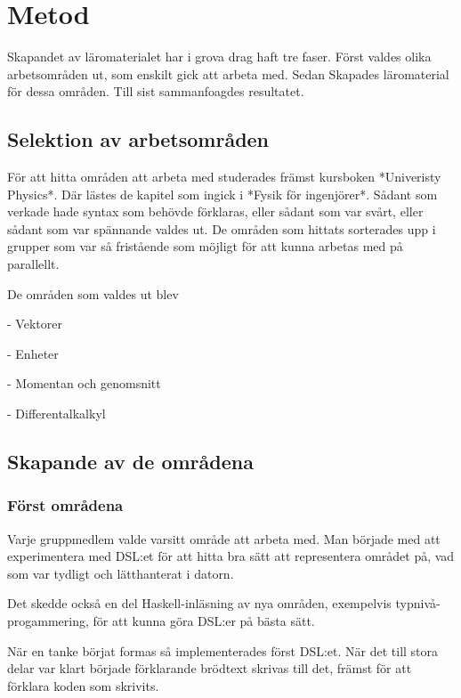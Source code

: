 
\chapter{Metod}

\begin{binge}
Skapandet av läromaterialet har i grova drag haft tre faser. Först valdes olika
arbetsområden ut, som enskilt gick att arbeta med. Sedan Skapades läromaterial
för dessa områden. Till sist sammanfoagdes resultatet.

\section{Selektion av arbetsområden}

För att hitta områden att arbeta med studerades främst kursboken *Univeristy
Physics*. Där lästes de kapitel som ingick i *Fysik för ingenjörer*. Sådant som
verkade hade syntax som behövde förklaras, eller sådant som var svårt, eller
sådant som var spännande valdes ut. De områden som hittats sorterades upp i
grupper som var så fristående som möjligt för att kunna arbetas med på
parallellt.

De områden som valdes ut blev

- Vektorer

- Enheter

- Momentan och genomsnitt

- Differentalkalkyl

\section{Skapande av de områdena}

\subsection{Först områdena}

Varje gruppmedlem valde varsitt område att arbeta med. Man började med att
experimentera med DSL:et för att hitta bra sätt att representera området på,
vad som var tydligt och lätthanterat i datorn.

Det skedde också en del Haskell-inläsning av nya områden, exempelvis
typnivå-progammering, för att kunna göra DSL:er på bästa sätt.

När en tanke börjat formas så implementerades först DSL:et. När det till stora
delar var klart började förklarande brödtext skrivas till det, främst för att
förklara koden som skrivits.


\end{binge}
